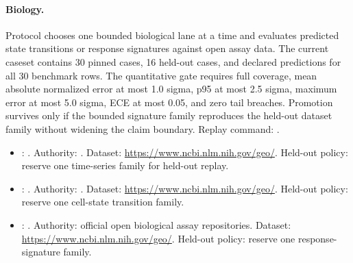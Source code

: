 \paragraph{Biology.}
Protocol
chooses one bounded biological lane at a time and evaluates predicted state
transitions or response signatures against open assay data. The current caseset
contains 30 pinned cases, 16 held-out cases, and declared predictions for all
30 benchmark rows. The quantitative gate requires full coverage, mean absolute
normalized error at most 1.0 sigma, p95 at most 2.5 sigma, maximum error at
most 5.0 sigma, ECE at most 0.05, and zero tail breaches. Promotion survives
only if the bounded signature family reproduces the held-out dataset family
without widening the claim boundary. Replay command:
.
\begin{itemize}[leftmargin=1.5em,nosep]
\item {}: . Authority: . Dataset: \url{https://www.ncbi.nlm.nih.gov/geo/}. Held-out policy: reserve one time-series family for held-out replay.
\item {}: . Authority: . Dataset: \url{https://www.ncbi.nlm.nih.gov/geo/}. Held-out policy: reserve one cell-state transition family.
\item {}: . Authority: official open biological assay repositories. Dataset: \url{https://www.ncbi.nlm.nih.gov/geo/}. Held-out policy: reserve one response-signature family.
\end{itemize}

